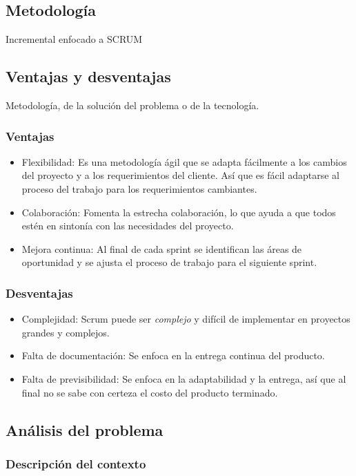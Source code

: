 \documentclass{article}
\begin{document}
\subsection{Metodología}
Incremental enfocado a SCRUM

\subsection{Ventajas y desventajas}
Metodología, de la solución del problema o de la tecnología.

\subsubsection{Ventajas}
\begin{itemize}
	\item Flexibilidad: Es una metodología ágil que se adapta fácilmente a los cambios del proyecto y a los requerimientos del cliente. Así que es fácil adaptarse al proceso del trabajo para los requerimientos cambiantes.
	\item Colaboración: Fomenta la estrecha colaboración, lo que ayuda a que todos estén en sintonía con las necesidades del proyecto.
	\item Mejora continua: Al final de cada sprint se identifican las áreas de oportunidad y se ajusta el proceso de trabajo para el siguiente sprint.
\end{itemize}
\subsubsection{Desventajas}
\begin{itemize}
	\item Complejidad: Scrum puede ser \emph{complejo} y difícil de implementar en proyectos grandes y complejos.
	\item Falta de documentación: Se enfoca en la entrega continua del producto.
	\item Falta de previsibilidad: Se enfoca en la adaptabilidad y la entrega, así que al final no se sabe con certeza el costo del producto terminado.
\end{itemize}

\subsection{Análisis del problema}
\subsubsection{Descripción del contexto}
\end{document}
